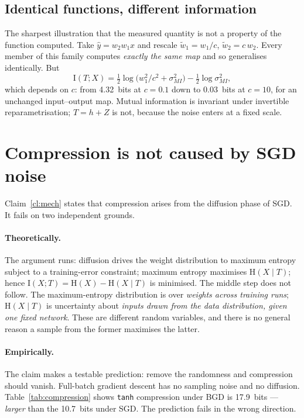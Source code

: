 \documentclass[11pt,a4paper]{article}
\newcommand{\I}{\mathrm{I}}
\newcommand{\HH}{\mathrm{H}}
\newcommand{\smi}{\sigma_{MI}}
\begin{document}
\subsection{Identical functions, different information}
\label{sec:rescale}

The sharpest illustration that the measured quantity is not a property of the
function computed. Take $\hat{y}=w_2w_1x$ and rescale
$\tilde{w}_1 = w_1/c$, $\tilde{w}_2 = c\,w_2$. Every member of this family
computes \emph{exactly the same map} and so generalises identically. But
\begin{equation}
  \I(T;X) = \tfrac12\log\big(w_1^2/c^2+\smi^2\big) - \tfrac12\log\smi^2,
  \label{eq:c5}
\end{equation}
which depends on $c$: from \SI{4.32}{bits} at $c=0.1$ down to \SI{0.03}{bits} at
$c=10$, for an unchanged input--output map. Mutual information is invariant under
invertible reparametrisation; $T=h+Z$ is not, because the noise enters at a fixed
scale.

\section{Compression is not caused by SGD noise}

Claim~\ref{cl:mech} states that compression arises from the diffusion phase of
SGD. It fails on two independent grounds.

\paragraph{Theoretically.} The argument runs: diffusion drives the weight
distribution to maximum entropy subject to a training-error constraint; maximum
entropy maximises $\HH(X\mid T)$; hence $\I(X;T)=\HH(X)-\HH(X\mid T)$ is
minimised. The middle step does not follow. The maximum-entropy distribution is
over \emph{weights across training runs}; $\HH(X\mid T)$ is uncertainty about
\emph{inputs drawn from the data distribution, given one fixed network}. These
are different random variables, and there is no general reason a sample from the
former maximises the latter.

\paragraph{Empirically.} The claim makes a testable prediction: remove the
randomness and compression should vanish. Full-batch gradient descent has no
sampling noise and no diffusion. Table~\ref{tab:compression} shows \texttt{tanh}
compression under BGD is \SI{17.9}{bits} --- \emph{larger} than the
\SI{10.7}{bits} under SGD. The prediction fails in the wrong direction.
\end{document}
